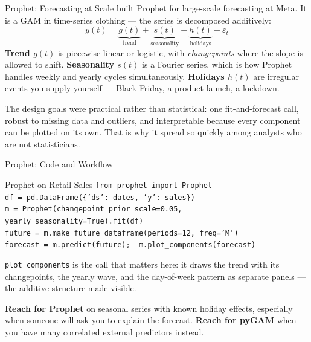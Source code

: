 \documentclass[aspectratio=169, 11pt]{beamer}
\begin{document}
\begin{frame}{Prophet: Forecasting at Scale}
  \textcite{TaylorLetham2018} built Prophet for large-scale forecasting at Meta. It is a GAM
  in time-series clothing --- the series is decomposed additively:
  \[
    y(t) = \underbrace{g(t)}_{\text{trend}} + \underbrace{s(t)}_{\text{seasonality}}
          + \underbrace{h(t)}_{\text{holidays}} + \varepsilon_t
  \]
  \textbf{Trend $g(t)$} is piecewise linear or logistic, with \emph{changepoints} where the
  slope is allowed to shift. \textbf{Seasonality $s(t)$} is a Fourier series, which is how
  Prophet handles weekly and yearly cycles simultaneously. \textbf{Holidays $h(t)$} are
  irregular events you supply yourself --- Black Friday, a product launch, a lockdown.

  \vspace{0.2cm}
  The design goals were practical rather than statistical: one fit-and-forecast call, robust
  to missing data and outliers, and interpretable because every component can be plotted on
  its own. That is why it spread so quickly among analysts who are not statisticians.

  \vspace{0.1cm}
\end{frame}

\begin{frame}{Prophet: Code and Workflow}
  \begin{examplebox}{Prophet on Retail Sales}
    {\scriptsize
    \texttt{from prophet import Prophet}\\
    \texttt{df = pd.DataFrame(\{'ds': dates, 'y': sales\})}\\
    \texttt{m = Prophet(changepoint\_prior\_scale=0.05, yearly\_seasonality=True).fit(df)}\\
    \texttt{future = m.make\_future\_dataframe(periods=12, freq='M')}\\
    \texttt{forecast = m.predict(future);\ \ m.plot\_components(forecast)}
    }
  \end{examplebox}
  \texttt{plot\_components} is the call that matters here: it draws the trend with its
  changepoints, the yearly wave, and the day-of-week pattern as separate panels --- the
  additive structure made visible.

  \vspace{0.15cm}
  \textbf{Reach for Prophet} on seasonal series with known holiday effects, especially when
  someone will ask you to explain the forecast. \textbf{Reach for pyGAM} when you have many
  correlated external predictors instead.
\end{frame}
\end{document}
